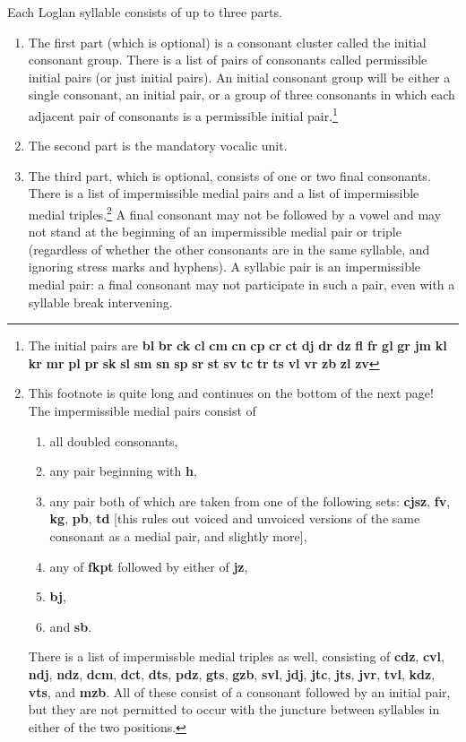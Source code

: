 \documentclass[12pt]{book}
\begin{document}
Each Loglan syllable consists of up to three parts.  
\begin{enumerate}

\item The first part (which is optional) is a consonant cluster called the initial consonant group.  There is a list of pairs of consonants  called permissible initial pairs (or just initial pairs).  An initial consonant group will be either a single consonant, an initial pair, or a group of three consonants in which each adjacent pair of consonants is a permissible initial pair.\footnote{The initial pairs are {\bf bl}  {\bf br}  {\bf ck}  {\bf cl}  {\bf cm}  {\bf cn}   {\bf cp}  {\bf cr}   {\bf ct}   {\bf dj}   {\bf dr}   {\bf dz}  {\bf fl}  {\bf fr}   {\bf gl}   {\bf gr}   {\bf jm}   {\bf kl}  {\bf kr}   {\bf mr}   {\bf pl}  {\bf pr}   {\bf sk}  {\bf sl}   {\bf sm}  {\bf sn}  {\bf sp}   {\bf sr}  {\bf st}  {\bf sv} {\bf tc}  {\bf tr}  {\bf ts}  {\bf vl}  {\bf vr} {\bf  zb}  {\bf  zl}  {\bf zv}}

\item The second part is the mandatory vocalic unit.

\item The third part, which is optional, consists of one or two final consonants.  There is a list of impermissible medial pairs and a list of impermissible medial triples.\footnote{This footnote is quite long and continues on the bottom of the next page! The impermissible medial pairs consist of 

\begin{enumerate}

\item all doubled consonants, 

\item  any pair beginning with {\bf h}, 

\item any pair both of which are taken from one of the following sets: {\bf cjsz}, {\bf fv}, {\bf kg}, {\bf pb}, {\bf td} [this rules out voiced and unvoiced versions of the same consonant as a medial pair, and slightly more],
\item any of {\bf fkpt} followed by either of {\bf jz}, \item {\bf bj}, \item and {\bf sb}.\end{enumerate}

There is a list of impermissble medial triples as well, consisting of {\bf cdz}, {\bf cvl}, {\bf ndj}, {\bf ndz}, {\bf dcm}, {\bf dct}, {\bf dts}, {\bf pdz}, {\bf gts}, {\bf gzb}, {\bf svl}, {\bf jdj}, {\bf jtc}, {\bf jts}, {\bf jvr}, {\bf tvl}, {\bf kdz}, {\bf vts}, and {\bf mzb}.  All of these consist of a consonant followed by an initial pair, but they are not permitted to occur with the juncture between syllables in either of the two positions.} A final consonant
may not be followed by a vowel and may not stand at the beginning of an impermissible medial pair or triple (regardless of whether the other consonants are in the same syllable, and ignoring stress marks and hyphens).  A syllabic pair is an impermissible medial pair:  a final consonant may not participate in such a pair, even with a syllable break intervening.


\end{enumerate}
\end{document}
